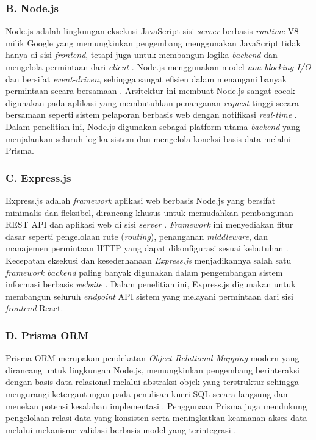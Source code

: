 \subsubsection*{B. Node.js} \label{II.NodeJS}
Node.js adalah lingkungan eksekusi JavaScript sisi \textit{server} berbasis \textit{runtime} V8 milik Google yang memungkinkan pengembang menggunakan JavaScript tidak hanya di sisi \textit{frontend}, tetapi juga untuk membangun logika \textit{backend} dan mengelola permintaan dari \textit{client} \cite{bianchin2021nodejs}. Node.js menggunakan model \textit{non-blocking I/O} dan bersifat \textit{event-driven}, sehingga sangat efisien dalam menangani banyak permintaan secara bersamaan \cite{bianchin2021nodejs}. Arsitektur ini membuat Node.js sangat cocok digunakan pada aplikasi yang membutuhkan penanganan \textit{request} tinggi secara bersamaan seperti sistem pelaporan berbasis web dengan notifikasi \textit{real-time} \cite{bianchin2021nodejs}. Dalam penelitian ini, Node.js digunakan sebagai platform utama \textit{backend} yang menjalankan seluruh logika sistem dan mengelola koneksi basis data melalui Prisma. \par

\subsubsection*{C. Express.js} \label{II.ExpressJS}
Express.js adalah \textit{framework} aplikasi web berbasis Node.js yang bersifat minimalis dan fleksibel, dirancang khusus untuk memudahkan pembangunan REST API dan aplikasi web di sisi \textit{server} \cite{chiyo2021expressjs}. \textit{Framework} ini menyediakan fitur dasar seperti pengelolaan rute (\textit{routing}), penanganan \textit{middleware}, dan manajemen permintaan HTTP yang dapat dikonfigurasi sesuai kebutuhan \cite{chiyo2021expressjs}. Kecepatan eksekusi dan kesederhanaan \textit{Express.js} menjadikannya salah satu \textit{framework backend} paling banyak digunakan dalam pengembangan sistem informasi berbasis \textit{website} \cite{chiyo2021expressjs}. Dalam penelitian ini, Express.js digunakan untuk membangun seluruh \textit{endpoint} API sistem yang melayani permintaan dari sisi \textit{frontend} React. \par

\subsubsection*{D. Prisma ORM} \label{II.Prisma}
Prisma ORM merupakan pendekatan \textit{Object Relational Mapping} modern yang dirancang untuk lingkungan Node.js, memungkinkan pengembang berinteraksi dengan basis data relasional melalui abstraksi objek yang terstruktur sehingga mengurangi ketergantungan pada penulisan kueri SQL secara langsung dan menekan potensi kesalahan implementasi \cite{ramadhan2025prisma}. Penggunaan Prisma juga mendukung pengelolaan relasi data yang konsisten serta meningkatkan keamanan akses data melalui mekanisme validasi berbasis model yang terintegrasi \cite{ramadhan2025prisma}. \par

